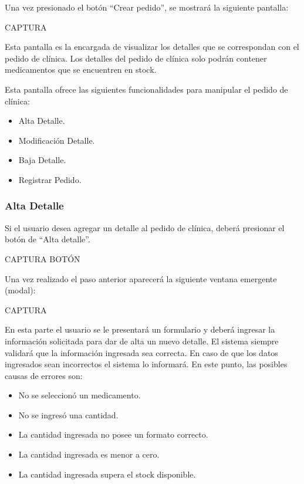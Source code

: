 \documentclass[letterpaper,10pt,spanish]{sphinxmanual}
\begin{document}
Una vez presionado el botón “Crear pedido”, se mostrará la siguiente pantalla:

CAPTURA

Esta pantalla es la encargada de visualizar los detalles que se correspondan con el pedido de clínica.
Los detalles del pedido de clínica solo podrán contener medicamentos que se encuentren en stock.

Esta pantalla ofrece las siguientes funcionalidades para manipular el pedido de clínica:
\begin{itemize}
\item {} 
Alta Detalle.

\item {} 
Modificación Detalle.

\item {} 
Baja Detalle.

\item {} 
Registrar Pedido.

\end{itemize}


\subsubsection{Alta Detalle}
\label{pedidosclinica:alta-detalle}
Si el usuario desea agregar un detalle al pedido de clínica, deberá presionar el botón de “Alta detalle”.

CAPTURA BOTÓN

Una vez realizado el paso anterior aparecerá la siguiente ventana emergente (modal):

CAPTURA

En esta parte el usuario se le presentará un formulario y deberá ingresar la información solicitada para dar de alta un nuevo detalle.
El sistema siempre validará que la información ingresada sea correcta. En caso de que los datos ingresados sean incorrectos el sistema lo informará.
En este punto, las posibles causas de errores son:
\begin{itemize}
\item {} 
No se seleccionó un medicamento.

\item {} 
No se ingresó una cantidad.

\item {} 
La cantidad ingresada no posee un formato correcto.

\item {} 
La cantidad ingresada es menor a cero.

\item {} 
La cantidad ingresada supera el stock disponible.

\end{itemize}
\end{document}
